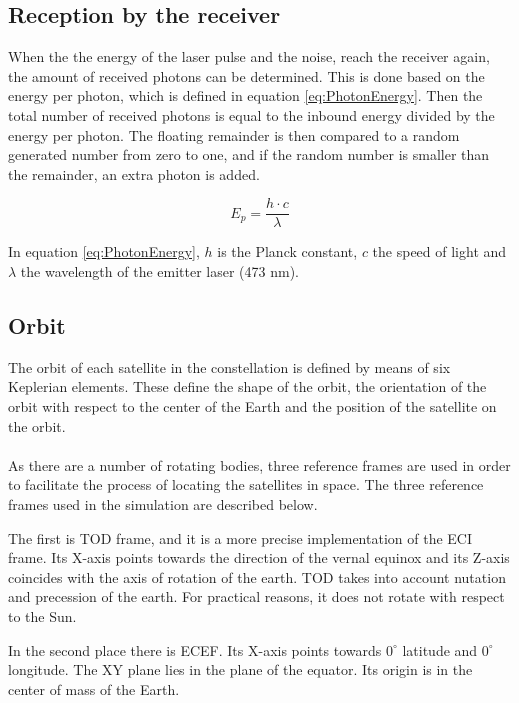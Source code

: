 \subsection{Reception by the receiver}

When the the energy of the laser pulse and the noise, reach the receiver again, the amount of received photons can be determined. This is done based on the energy per photon, which is defined in equation \ref{eq:PhotonEnergy}. Then the total number of received photons is equal to the inbound energy divided by the energy per photon. The floating remainder is then compared to a random generated number from zero to one, and if the random number is smaller than the remainder, an extra photon is added.

\begin{equation}
	E_{p}=\frac{h \cdot c}{\lambda}
	\label{eq:PhotonEnergy}
\end{equation}

In equation \ref{eq:PhotonEnergy}, $h$ is the Planck constant, $c$ the speed of light and $\lambda$ the wavelength of the emitter laser (473 nm).

\subsection{Orbit}
\label{orbit}
The orbit of each satellite in the constellation is defined by means of six Keplerian elements. These define the shape of the orbit, the orientation of the orbit with respect to the center of the Earth and the position of the satellite on the orbit.\\\\
As there are a number of rotating bodies, three reference frames are used in order to facilitate the process of locating the satellites in space. The three reference frames used in the simulation are described below.

The first is \ac{TOD} frame, and it is a more precise implementation of the \acs{ECI} frame. Its X-axis points towards the direction of the vernal equinox and its Z-axis coincides with the axis of rotation of the earth. \ac{TOD} takes into account nutation and precession of the earth. For practical reasons, it does not rotate with respect to the Sun.
 
In the second place there is \ac{ECEF}. Its X-axis points towards $0^\circ$ latitude and $0^\circ$ longitude. The XY plane lies in the plane of the equator. Its origin is in the center of mass of the Earth. 

